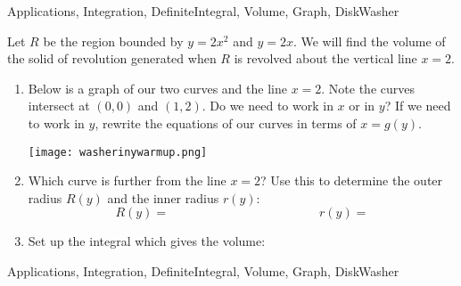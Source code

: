 \begin{tagblock}{Applications, Integration, DefiniteIntegral, Volume, Graph, DiskWasher}
\begin{question}
	


Let  $R$ be the region bounded by $y=2x^2$ and $y=2x$.  We will find the volume of the  solid of revolution generated when $R$ is revolved about the vertical line $x=2$.
\begin{enumerate}
\item Below is a graph of our two curves and the line $x=2$.  Note the curves intersect at $(0,0)$ and $(1,2)$.  Do we need to work in $x$ or in $y$?  If we need to work in $y$, rewrite the equations of our curves in terms of $x=g(y)$.  

\texttt{[image: washerinywarmup.png]}

\item  Which curve is further from the line $x=2$?  Use this to determine the outer radius $R(y)$ and the inner radius $r(y)$:
\[ R(y) = \hspace{2in} r(y) = \]

\item Set up the integral which gives the volume:

\end{enumerate}



    
\begin{tags}
       Applications, Integration, DefiniteIntegral, Volume, Graph, DiskWasher
\end{tags}
    
\begin{diary}
\end{diary}
	
\begin{solution}

\end{solution}
	
\end{question}

\end{tagblock}

